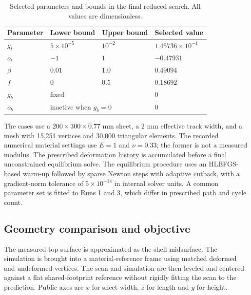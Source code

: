 \documentclass[11pt]{article}
\begin{document}
\begin{table}[ht]
\centering
\caption{Selected parameters and bounds in the final reduced search. All values are dimensionless.}
\label{tab:parameters}
\begin{tabular}{llll}\toprule
Parameter & Lower bound & Upper bound & Selected value \\\midrule
$g_t$ & $5\times10^{-5}$ & $10^{-2}$ & $1.45736\times10^{-4}$ \\
$o_t$ & $-1$ & $1$ & $-0.47931$ \\
$\beta$ & $0.01$ & $1.0$ & $0.49094$ \\
$f$ & $0$ & $0.5$ & $0.18692$ \\\midrule
$g_b$ & \multicolumn{2}{l}{fixed} & $0$ \\
$o_b$ & \multicolumn{2}{l}{inactive when $g_b=0$} & $0$ \\\bottomrule
\end{tabular}
\end{table}

The cases use a $200\times300\times0.77$ mm sheet, a $2$ mm effective track width, and a mesh with 15,251 vertices and 30,000 triangular elements. The recorded numerical material settings use $E=1$ and $\nu=0.33$; the former is not a measured modulus. The prescribed deformation history is accumulated before a final unconstrained equilibrium solve. The equilibrium procedure uses an HLBFGS-based warm-up followed by sparse Newton steps with adaptive cutback, with a gradient-norm tolerance of $5\times10^{-14}$ in internal solver units. A common parameter set is fitted to Runs 1 and 3, which differ in prescribed path and cycle count.

\subsection{Geometry comparison and objective}
The measured top surface is approximated as the shell midsurface. The simulation is brought into a material-reference frame using matched deformed and undeformed vertices. The scan and simulation are then leveled and centered against a flat shared-footprint reference without rigidly fitting the scan to the prediction. Public axes are $x$ for sheet width, $z$ for length and $y$ for height.
\end{document}

